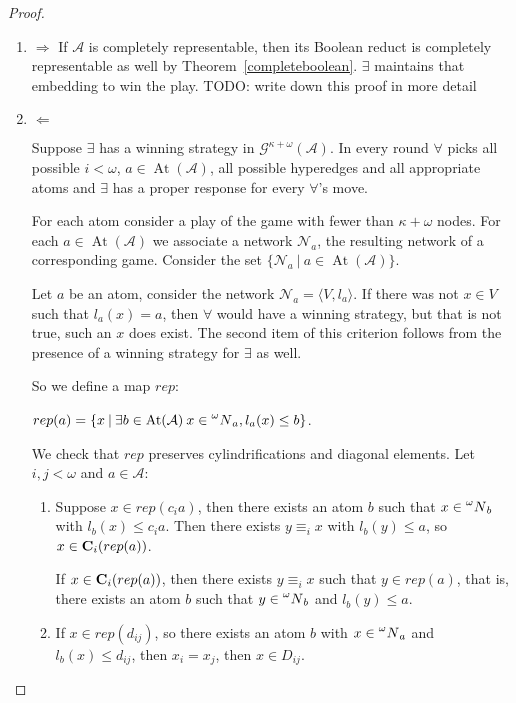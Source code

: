 \documentclass[a4paper]{article}
\theoremstyle{defin}
\theoremstyle{theorem}
\theoremstyle{prop}
\theoremstyle{lemma}
\theoremstyle{fact}
\theoremstyle{ex}
\theoremstyle{col}
\begin{document}
\begin{proof}
  $ $

  \begin{enumerate}
    \item $\Rightarrow$
    If $\mathcal{A}$ is completely representable, then its Boolean reduct is completely representable as well by Theorem~\ref{completeboolean}. $\exists$ maintains that embedding to win the play. TODO: write down this proof in more detail

    \item $\Leftarrow$

    Suppose $\exists$ has a winning strategy in $\mathcal{G}^{\kappa + \omega}(\mathcal{A})$.
    In every round $\forall$ picks all possible $i < \omega$, $a \in \operatorname{At}(\mathcal{A})$, all possible hyperedges and all appropriate atoms and $\exists$ has a proper response for every $\forall$'s move.

    For each atom consider a play of the game with fewer than $\kappa + \omega$ nodes. For each $a \in \operatorname{At}(\mathcal{A})$ we associate a network $\mathcal{N}_a$, the resulting network of a corresponding game. Consider the set $\{ \mathcal{N}_a \: | \: a \in \operatorname{At}(\mathcal{A}) \}$.

    Let $a$ be an atom, consider the network $\mathcal{N}_a = \langle V, l_a \rangle$. If there was not $x \in V$ such that $l_a(x) = a$, then $\forall$ would have a winning strategy, but that is not true, such an $x$ does exist. The second item of this criterion follows from the presence of a winning strategy for $\exists$ as well.

    So we define a map $rep$:
    \begin{center}
    $rep(a) = \{ x \: | \: \exists b \in \operatorname{At}(\mathcal{A}) \: x \in \prescript{\omega}{}N_a, l_a(x) \leq b \}$.
  \end{center}
    We check that $rep$ preserves cylindrifications and diagonal elements. Let $i, j < \omega$ and $a \in \mathcal{A}$:
    \begin{enumerate}
    \item Suppose $x \in rep(c_i a)$, then there exists an atom $b$ such that $x \in \prescript{\omega}{}N_b$ with $l_b(x) \leq c_i a$. Then there exists $y \equiv_i x$ with $l_b(y) \leq a$, so $x \in {\bf C}_i(rep(a))$.

    If $x \in {\bf C}_i(rep(a))$, then there exists $y \equiv_i x$ such that $y \in rep(a)$, that is, there exists an atom $b$ such that $y \in \prescript{\omega}{}N_b$ and $l_b(y) \leq a$.
    \item If $x \in rep(d_{ij})$, so there exists an atom $b$ with $x \in \prescript{\omega}{}N_a$ and $l_b(x) \leq d_{ij}$, then $x_i = x_j$, then $x \in D_{ij}$.
    \end{enumerate}
  \end{enumerate}
\end{proof}
\end{document}
